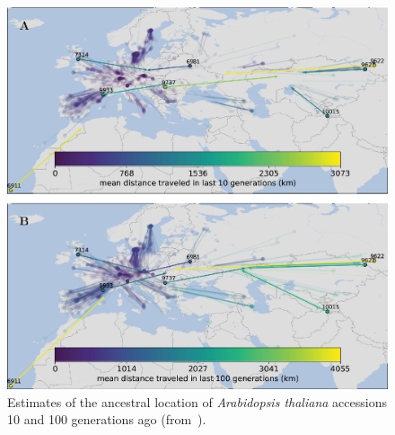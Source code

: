 \documentclass[12pt]{article}
\begin{document}
\begin{figure}
  \begin{center}
    \includegraphics[width=14cm]{arabidopsis-dispersal.eps}
  \end{center}
  \caption{Estimates of the ancestral location of {\it Arabidopsis
      thaliana\/} accessions 10 and 100 generations ago
    (from~\cite{Osmond-Coop-2021}).}\label{fig:arabidopsis-dispersal}
\end{figure}




\ccLicense
\end{document}

